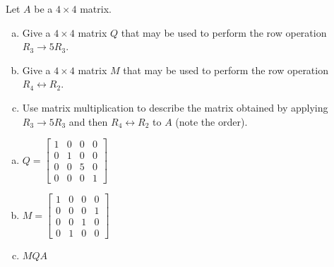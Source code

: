
\begin{exerciseStatement}


Let \(A\) be a \(4 \times 4\) matrix.


\begin{enumerate}[(a)]
\item Give a \(4 \times 4\) matrix \(Q\) that may be used to perform the row operation \( R_3 \to 5R_3 \).
\item Give a \(4 \times 4\) matrix \(M\) that may be used to perform the row operation \( R_4 \leftrightarrow R_2 \).
\item Use matrix multiplication to describe the matrix obtained by applying \( R_3 \to 5R_3 \) and then \( R_4 \leftrightarrow R_2 \) to \(A\) (note the order). 
\end{enumerate}
    
\end{exerciseStatement}
    
\begin{exerciseAnswer} 

\begin{enumerate}[(a)]
\item \(Q= \left[\begin{array}{cccc}
1 & 0 & 0 & 0 \\
0 & 1 & 0 & 0 \\
0 & 0 & 5 & 0 \\
0 & 0 & 0 & 1
\end{array}\right] \)
\item \(M= \left[\begin{array}{cccc}
1 & 0 & 0 & 0 \\
0 & 0 & 0 & 1 \\
0 & 0 & 1 & 0 \\
0 & 1 & 0 & 0
\end{array}\right] \)
\item \(MQA\)
\end{enumerate}
    
\end{exerciseAnswer}
    
